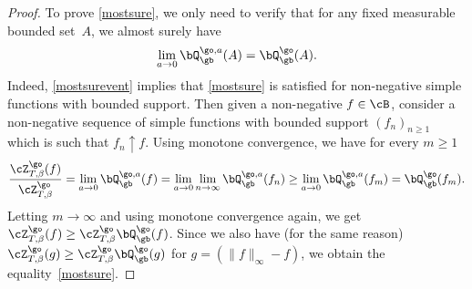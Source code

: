 \begin{proof}
To prove \eqref{mostsure},
we only need to verify that for any fixed measurable bounded set~$A$,
we almost surely have
\begin{equation}\label{mostsurevent}
\lim_{a\to 0}\bQ^{\go,a}_{\gb}(A)=\bQ^{\go}_{\gb}(A).
\end{equation}
Indeed, \eqref{mostsurevent} implies that \eqref{mostsure} is satisfied for non-negative simple functions with bounded support. Then given a non-negative $f\in \cB$, consider a non-negative sequence of simple functions with bounded support $(f_n)_{n\ge 1}$ which is such that $f_n\uparrow f$.
Using monotone convergence, we have for every $m\ge 1$
\begin{equation}
\frac{\cZ^{\go}_{T,\beta}(f)}{\cZ^{\go}_{T,\beta}} =\lim_{a\to 0}\bQ^{\go,a}_{\gb}(f)= \lim_{a\to 0}\lim_{n\to \infty} \bQ^{\go,a}_{\gb}(f_n)\ge \lim_{a\to 0}\bQ^{\go,a}_{\gb}(f_m)=\bQ^{\go}_{\gb}(f_m).
\end{equation}
Letting $m\to \infty$ and using monotone convergence again, we get
$\cZ^{\go}_{T,\beta}(f)\ge \cZ^{\go}_{T,\beta}\bQ^{\go}_{\gb}(f)$.
Since we also have (for the same reason) $\cZ^{\go}_{T,\beta}(g)\ge \cZ^{\go}_{T,\beta}\bQ^{\go}_{\gb}(g)$ for $g=(\|f\|_{\infty}-f)$, we obtain the equality~\eqref{mostsure}.


\end{proof}

